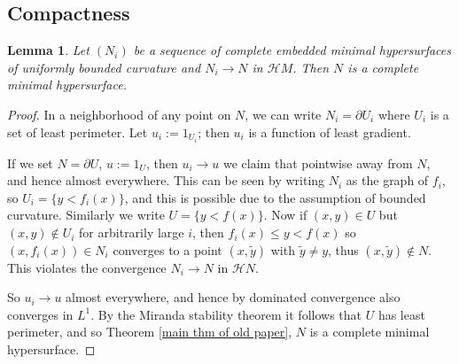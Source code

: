 \documentclass[reqno,11pt]{amsart}
\newcommand{\Hypspace}{\mathscr H}
\newtheorem{lemma}[theorem]{Lemma}
\theoremstyle{definition}
\numberwithin{equation}{section}
\begin{document}
\subsection{Compactness}

\begin{lemma}\label{limit of minimals is minimal}
Let $(N_i)$ be a sequence of complete embedded minimal hypersurfaces of uniformly bounded curvature and $N_i \to N$ in $\Hypspace M$.
Then $N$ is a complete minimal hypersurface.
\end{lemma}
\begin{proof}
In a neighborhood of any point on $N$, we can write $N_i = \partial U_i$ where $U_i$ is a set of least perimeter.
Let $u_i := 1_{U_i}$; then $u_i$ is a function of least gradient.

If we set $N = \partial U$, $u := 1_U$, then $u_i \to u$ we claim that pointwise away from $N$, and hence almost everywhere.
This can be seen by writing $N_i$ as the graph of $f_i$, so $U_i = \{y < f_i(x)\}$, and this is possible due to the assumption of bounded curvature.
Similarly we write $U = \{y < f(x)\}$.
Now if $(x, y) \in U$ but $(x, y) \notin U_i$ for arbitrarily large $i$, then $f_i(x) \leq y < f(x)$ so $(x, f_i(x)) \in N_i$ converges to a point $(x, \tilde y)$ with $\tilde y \neq y$, thus $(x, \tilde y) \notin N$.
This violates the convergence $N_i \to N$ in $\Hypspace N$.

So $u_i \to u$ almost everywhere, and hence by dominated convergence also converges in $L^1$.
By the Miranda stability theorem it follows that $U$ has least perimeter, and so Theorem \ref{main thm of old paper}, $N$ is a complete minimal hypersurface.
\end{proof}
\end{document}
